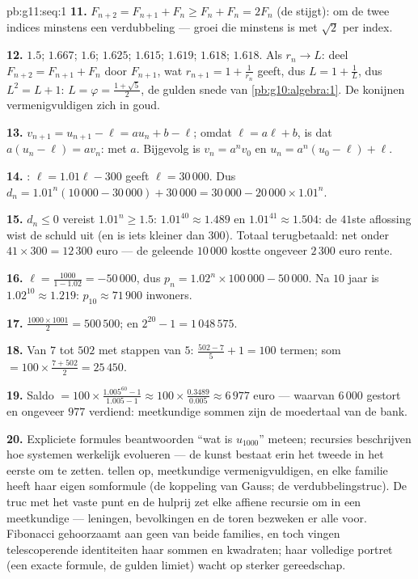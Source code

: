 \begin{solution}{pb:g11:seq:1}
\textbf{11.} $F_{n+2} = F_{n+1} + F_n \geq F_n + F_n = 2F_n$ (de 
stijgt): om de twee indices minstens een verdubbeling --- groei die minstens
 is met  $\sqrt2$ per index.

\textbf{12.} $1.5$; $1.667$; $1.6$; $1.625$; $1.615$; $1.619$; $1.618$;
$1.618$. Als $r_n \to L$: deel $F_{n+2} = F_{n+1} + F_n$ door $F_{n+1}$, wat
$r_{n+1} = 1 + \frac{1}{r_n}$ geeft, dus $L = 1 + \frac1L$, dus
$L^2 = L + 1$: $L = \varphi = \frac{1 + \sqrt5}{2}$, de gulden snede van
\cref{pb:g10:algebra:1}. De konijnen vermenigvuldigen zich in goud.

\textbf{13.} $v_{n+1} = u_{n+1} - \ell = a u_n + b - \ell$; omdat
$\ell = a\ell + b$, is dat $a(u_n - \ell) = a v_n$:  met 
$a$. Bijgevolg is $v_n = a^n v_0$ en $u_n = a^n (u_0 - \ell) + \ell$.

\textbf{14.} : $\ell = 1.01\ell - 300$ geeft $\ell = 30\,000$. Dus
$d_n = 1.01^n (10\,000 - 30\,000) + 30\,000 = 30\,000 - 20\,000 \times
1.01^n$.

\textbf{15.} $d_n \leq 0$ vereist $1.01^n \geq 1.5$:
$1.01^{40} \approx 1.489$ en $1.01^{41} \approx 1.504$: de $41$ste
aflossing wist de schuld uit (en is iets kleiner dan $300$). Totaal
terugbetaald: net onder $41 \times 300 = 12\,300$ euro --- de geleende
$10\,000$ kostte ongeveer $2\,300$ euro rente.

\textbf{16.}  $\ell = \frac{1000}{1 - 1.02} = -50\,000$, dus
$p_n = 1.02^n \times 100\,000 - 50\,000$. Na $10$ jaar is
$1.02^{10} \approx 1.219$: $p_{10} \approx 71\,900$ inwoners.

\textbf{17.} $\frac{1000 \times 1001}{2} = 500\,500$; en
$2^{20} - 1 = 1\,048\,575$.

\textbf{18.} Van $7$ tot $502$ met stappen van $5$:
$\frac{502 - 7}{5} + 1 = 100$ termen; som
$= 100 \times \frac{7 + 502}{2} = 25\,450$.

\textbf{19.} Saldo $= 100 \times \frac{1.005^{60} - 1}{1.005 - 1} \approx
100 \times \frac{0.3489}{0.005} \approx 6\,977$ euro --- waarvan $6\,000$
gestort en ongeveer $977$ verdiend: meetkundige sommen zijn de moedertaal
van de bank.

\textbf{20.} Expliciete formules beantwoorden ``wat is $u_{1000}$'' meteen;
recursies beschrijven hoe systemen werkelijk evolueren --- de kunst bestaat
erin het tweede in het eerste om te zetten.  tellen op,
meetkundige vermenigvuldigen, en elke familie heeft haar eigen somformule
(de koppeling van Gauss; de verdubbelingstruc). De truc met het vaste punt
en de hulprij zet elke affiene recursie om in een meetkundige --- leningen,
bevolkingen en de toren bezweken er alle voor. Fibonacci gehoorzaamt aan geen
van beide families, en toch vingen telescoperende identiteiten haar sommen en
kwadraten; haar volledige portret (een exacte formule, de gulden limiet)
wacht op sterker gereedschap.
\end{solution}
